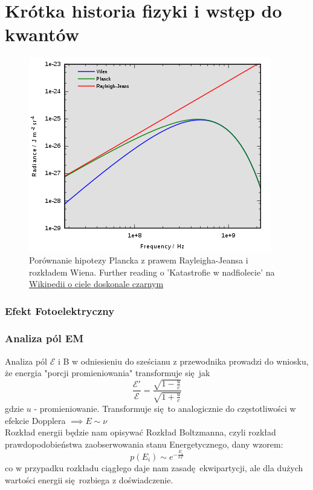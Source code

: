 \documentclass[12pt,a4paper]{report}
\newcommand{\ind}[1]{{\color{blue} #1\index{#1}}}
\newcommand{\link}[2]{{\color{cyan} \href{#1}{#2}}}
\newcommand{\E}{\mathcal{E}}
\newenvironment{lecture}[1]{\par\medskip
   \noindent\chapter{#1} \rmfamily}{\medskip}
\begin{document}
\begin{lecture}{Krótka historia fizyki i wstęp do kwantów}
    \begin{figure}[!ht]
        \centering
        \includegraphics[width=\linewidth]{Wyk_1_Rys_6.png}
        \caption{Porównanie hipotezy Plancka z prawem Rayleigha-Jeansa i rozkładem Wiena. Further reading o 'Katastrofie w nadfiolecie'  na \link{https://pl.wikipedia.org/wiki/Ciało_doskonale_czarne}{Wikipedii o ciele doskonale czarnym}}
        \label{fig:lec_1:cialo_doskonale_czarne_porownanie}
    \end{figure}
    
    \subsection{Efekt Fotoelektryczny}
    \subsection{Analiza pól EM}
    Analiza pól $\E$ i B w odniesieniu do sześcianu z przewodnika prowadzi do wniosku, że energia "porcji promieniowania" transformuje się jak 
    \[\frac{\E'}{\E} = \frac{\sqrt{1 - \frac{u}{c}}}{\sqrt{1 + \frac{u}{c}}}\]
    gdzie $u$ - promieniowanie.
    Transformuje się to analogicznie do częstotliwości w efekcie Dopplera $\implies E \sim \nu$
    \\
    Rozkład energii będzie nam opisywać \ind{Rozkład Boltzmanna}, czyli rozkład prawdopodobieństwa zaobserwowania stanu Energetycznego, dany wzorem:
    \[p(E_i) \sim e^{-\frac{E_i}{k T}}\]
    co w przypadku rozkładu ciągłego daje nam zasadę ekwipartycji, ale dla dużych wartości energii się rozbiega z doświadczenie.
    

\end{lecture}
\end{document}
